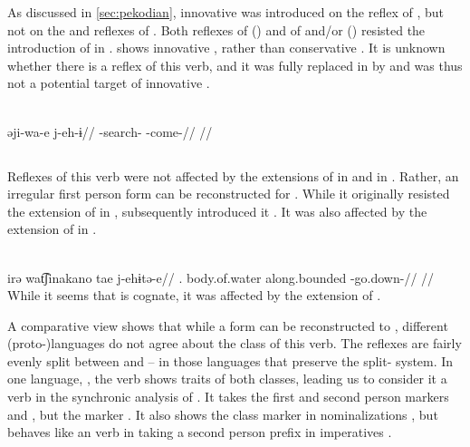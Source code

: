 As discussed in \cref{sec:pekodian}, innovative  was introduced on the \arara reflex of , but not on the \ikpeng and \bakairi reflexes of .
Both reflexes of  (\trio) and of  and/or  (\akuriyo) resisted the introduction of  in \PTir.
\carijo {} shows innovative , rather than conservative  .
It is unknown whether there is a \yukpa reflex of this verb, and it was fully replaced in \PWai by   and was thus not a potential target of innovative .

\carijo \parencite[][102]{guerrero2019carijo}\\
\begingl
\gla əji-wa-e j-eh-ɨ//
\glb {}-search- -come-//
\glft {}//
\endgl
\xe

\subsection{ }
\label{sec:godown}
Reflexes of this verb were not affected by the extensions of  in \PTir {} and  in \akuriyo {}.
Rather, an irregular first person form  can be reconstructed for \PTir.
While it originally resisted the extension of  in \PPek, \bakairi subsequently introduced it .
It was also affected by the extension of  in \carijo {}.

\carijo {}\\
\begingl
\gla irə wat͡ʃinakano tae j-ehɨtə-e//
\glb {}. body.of.water along.bounded -go.down-//
\glft {}//
\endgl
\xe
%
While it seems that \yukpa {}  \parencite{meira2003primeras} is cognate, it was affected by the extension of .



A comparative view  shows that while a form  can be reconstructed to \PC, different (proto-)languages do not agree about the class of this verb.
The reflexes are fairly evenly split between  and  -- in those languages that preserve the split- system.
In one language, \wayana, the verb shows traits of both classes, leading us to consider it a  verb in the synchronic analysis of \wayana.
It takes the first and second person  markers  and  \parencite[200]{wayanatavares2005}, but the  marker  \parencite[206]{wayanatavares2005}.
It also shows the  class marker  in nominalizations , but behaves like an  verb in taking a second person prefix in imperatives .

